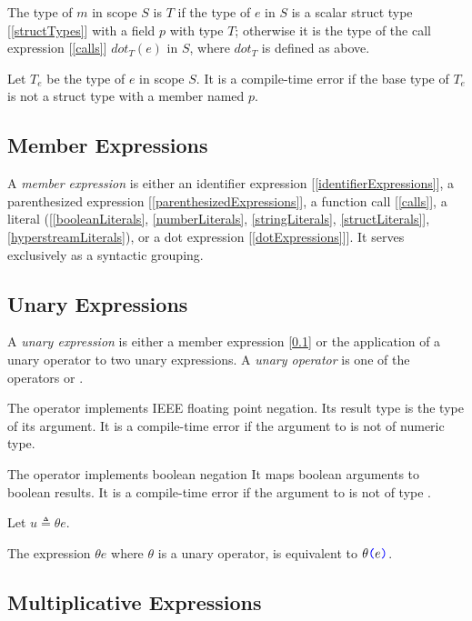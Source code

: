 \documentclass{article}
\begin{document}
The type of $m$ in scope $S$
 is $T$ if the type of $e$ in $S$ is a scalar struct type [\ref{structTypes}] with a field $p$ with type $T$; otherwise it is the type of the call expression [\ref{calls}] $dot_T(e)$ in $S$, where $dot_T$ is defined as above.

Let $T_e$ be the type of $e$ in scope $S$.  It is a compile-time error if the base type of $T_e$ is not a struct type with a member named $p$. 

\subsection{Member Expressions}
\label{memberExpression}

A {\em member expression} is either an identifier expression [\ref{identifierExpressions}], a parenthesized expression [\ref{parenthesizedExpressions}], a function call [\ref{calls}], a literal ([\ref{booleanLiterals}, \ref{numberLiterals}, \ref{stringLiterals}, \ref{structLiterals}], \ref{hyperstreamLiterals}), or a dot expression [\ref{dotExpressions}]]. It serves exclusively as a syntactic grouping.


\subsection{Unary Expressions}
\label{unaryExpressions}

A {\em unary expression} is either a member expression [\ref{memberExpression}] or the application of a unary operator to two unary expressions.
A {\em unary operator} is one of the operators \MINUS{} or  \NOT{}. 

The \MINUS{} operator implements IEEE floating point negation. Its result type is the type of its argument. It is a compile-time error if the argument to \MINUS{} is not of numeric type. 

The \NOT{} operator implements boolean negation It maps boolean arguments to boolean results. It is a compile-time error if the argument to \NOT{} is not of type \BOOL.

\UnaryExpression{}

Let $u \triangleq \theta{} e$.

The expression $\theta e$ where $\theta$ is a unary operator, is equivalent to $\theta\texttt{\color{blue} (}{}e\texttt{\color{blue} )}{}$.

\subsection{Multiplicative Expressions}
\label{multiplicativeExpressions}
\end{document}

